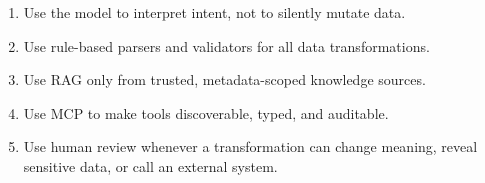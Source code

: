\begin{enumerate}
  \item Use the model to interpret intent, not to silently mutate data.
  \item Use rule-based parsers and validators for all data transformations.
  \item Use RAG only from trusted, metadata-scoped knowledge sources.
  \item Use MCP to make tools discoverable, typed, and auditable.
  \item Use human review whenever a transformation can change meaning, reveal sensitive data, or call an external system.
\end{enumerate}
